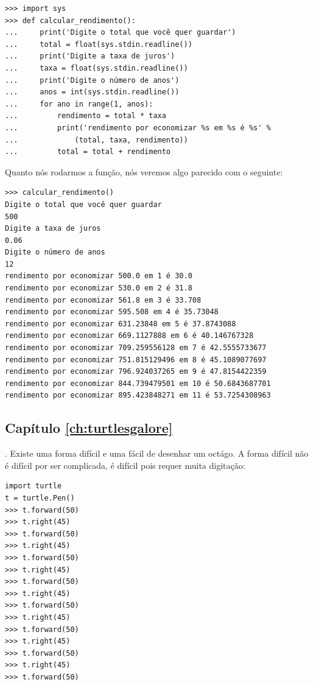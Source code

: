 \begin{listing}
\begin{verbatim}
>>> import sys
>>> def calcular_rendimento():
...     print('Digite o total que você quer guardar')
...     total = float(sys.stdin.readline())
...     print('Digite a taxa de juros')
...     taxa = float(sys.stdin.readline())
...     print('Digite o número de anos')
...     anos = int(sys.stdin.readline())
...     for ano in range(1, anos):
...         rendimento = total * taxa
...         print('rendimento por economizar %s em %s é %s' % 
...             (total, taxa, rendimento))
...         total = total + rendimento
\end{verbatim}
\end{listing}

\noindent
Quanto nós rodarmos a função, nós veremos algo parecido com o seguinte:

\begin{listingignore}
\begin{verbatim}
>>> calcular_rendimento()
Digite o total que você quer guardar
500
Digite a taxa de juros
0.06
Digite o número de anos
12
rendimento por economizar 500.0 em 1 é 30.0
rendimento por economizar 530.0 em 2 é 31.8
rendimento por economizar 561.8 em 3 é 33.708
rendimento por economizar 595.508 em 4 é 35.73048
rendimento por economizar 631.23848 em 5 é 37.8743088
rendimento por economizar 669.1127888 em 6 é 40.146767328
rendimento por economizar 709.259556128 em 7 é 42.5555733677
rendimento por economizar 751.815129496 em 8 é 45.1089077697
rendimento por economizar 796.924037265 em 9 é 47.8154422359
rendimento por economizar 844.739479501 em 10 é 50.6843687701
rendimento por economizar 895.423848271 em 11 é 53.7254308963
\end{verbatim}
\end{listingignore}

\subsection*{Capítulo \ref{ch:turtlesgalore}}

. Existe uma forma difícil e uma fácil de desenhar um octágo. A forma difícil não é difícil por ser complicada, é difícil pois requer muita digitação:

\begin{listing}
\begin{verbatim}
import turtle
t = turtle.Pen()
>>> t.forward(50)
>>> t.right(45)
>>> t.forward(50)
>>> t.right(45)
>>> t.forward(50)
>>> t.right(45)
>>> t.forward(50)
>>> t.right(45)
>>> t.forward(50)
>>> t.right(45)
>>> t.forward(50)
>>> t.right(45)
>>> t.forward(50)
>>> t.right(45)
>>> t.forward(50)
\end{verbatim}
\end{listing}

